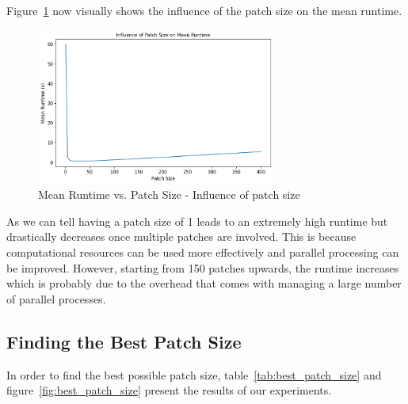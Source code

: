 \documentclass[a4paper,%
11pt,%
DIV12,
headsepline,%
headings=normal,
]{scrartcl}
\begin{document}
Figure~\ref{fig:patch_size} now visually shows the influence of the patch size on the mean runtime.

\begin{figure}[htb!]
    \centering
    \includegraphics[width=0.7\textwidth]{template-2/patch_size_runtime.png}
    \caption{Mean Runtime vs. Patch Size - Influence of patch size}
    \label{fig:patch_size}
\end{figure}



As we can tell having a patch size of 1 leads to an extremely high runtime but drastically decreases once multiple patches are involved. This is because computational resources can be used more effectively and parallel processing can be improved. However, starting from 150 patches upwards, the runtime increases which is probably due to the overhead that comes with managing a large number of parallel processes.

\subsection{Finding the Best Patch Size}

In order to find the best possible patch size, table~\ref{tab:best_patch_size} and figure~\ref{fig:best_patch_size} present the results of our experiments. 
\end{document}
